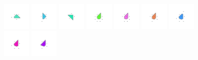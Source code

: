 \documentclass[text.tex]{subfiles}
\begin{document}
\begin{figure}[h!]
\includegraphics[width=0.12\textwidth]{img/results/octagon/octagon_235355_(7_1alpha_4)_005.pdf}
\includegraphics[width=0.12\textwidth]{img/results/octagon/octagon_235355_(7_1alpha_4)_006.pdf}
\includegraphics[width=0.12\textwidth]{img/results/octagon/octagon_235355_(7_1alpha_4)_007.pdf}
\includegraphics[width=0.12\textwidth]{img/results/octagon/octagon_235355_(7_1alpha_4)_008.pdf}
\includegraphics[width=0.12\textwidth]{img/results/octagon/octagon_235355_(7_1alpha_4)_009.pdf}
\includegraphics[width=0.12\textwidth]{img/results/octagon/octagon_235355_(7_1alpha_4)_010.pdf}
\includegraphics[width=0.12\textwidth]{img/results/octagon/octagon_235355_(7_1alpha_4)_011.pdf}
\includegraphics[width=0.12\textwidth]{img/results/octagon/octagon_235355_(7_1alpha_4)_012.pdf}
\includegraphics[width=0.12\textwidth]{img/results/octagon/octagon_235355_(7_1alpha_4)_013.pdf}

\end{figure}
\end{document}
